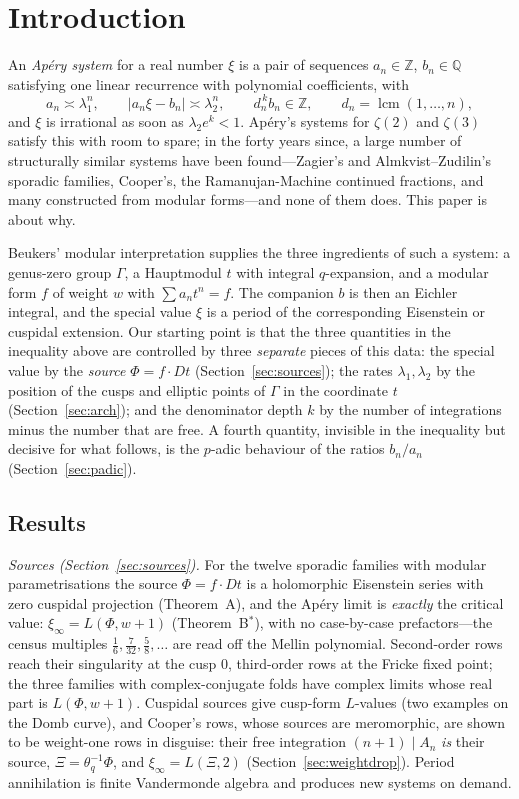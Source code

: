 \section{Introduction}\label{sec:intro}

An \emph{Ap\'ery system} for a real number $\xi$ is a pair of sequences $a_n\in\mathbb Z$, $b_n\in\mathbb Q$ satisfying one linear recurrence with polynomial coefficients, with
\[
a_n\asymp\lambda_1^n,\qquad |a_n\xi-b_n|\asymp\lambda_2^n,\qquad d_n^{\,k}b_n\in\mathbb Z,\qquad d_n=\operatorname{lcm}(1,\dots,n),
\]
and $\xi$ is irrational as soon as $\lambda_2e^k<1$. Ap\'ery's systems for $\zeta(2)$ and $\zeta(3)$ satisfy this with room to spare; in the forty years since, a large number of structurally similar systems have been found---Zagier's and Almkvist--Zudilin's sporadic families, Cooper's, the Ramanujan-Machine continued fractions, and many constructed from modular forms---and none of them does. This paper is about why.

Beukers' modular interpretation \cite{Beukers1987} supplies the three ingredients of such a system: a genus-zero group $\Gamma$, a Hauptmodul $t$ with integral $q$-expansion, and a modular form $f$ of weight $w$ with $\sum a_nt^n=f$. The companion $b$ is then an Eichler integral, and the special value $\xi$ is a period of the corresponding Eisenstein or cuspidal extension. Our starting point is that the three quantities in the inequality above are controlled by three \emph{separate} pieces of this data: the special value by the \emph{source} $\Phi=f\cdot Dt$ (Section~\ref{sec:sources}); the rates $\lambda_1,\lambda_2$ by the position of the cusps and elliptic points of $\Gamma$ in the coordinate $t$ (Section~\ref{sec:arch}); and the denominator depth $k$ by the number of integrations minus the number that are free. A fourth quantity, invisible in the inequality but decisive for what follows, is the $p$-adic behaviour of the ratios $b_n/a_n$ (Section~\ref{sec:padic}).

\subsection*{Results}

\emph{Sources (Section~\ref{sec:sources}).} For the twelve sporadic families with modular parametrisations the source $\Phi=f\cdot Dt$ is a holomorphic Eisenstein series with zero cuspidal projection (Theorem~A), and the Ap\'ery limit is \emph{exactly} the critical value: $\xi_\infty=L(\Phi,w+1)$ (Theorem~B$^*$), with no case-by-case prefactors---the census multiples $\tfrac16,\tfrac7{32},\tfrac58,\dots$ are read off the Mellin polynomial. Second-order rows reach their singularity at the cusp $0$, third-order rows at the Fricke fixed point; the three families with complex-conjugate folds have complex limits whose real part is $L(\Phi,w+1)$. Cuspidal sources give cusp-form $L$-values (two examples on the Domb curve), and Cooper's rows, whose sources are meromorphic, are shown to be weight-one rows in disguise: their free integration $(n+1)\mid A_n$ \emph{is} their source, $\Xi=\theta_q^{-1}\Phi$, and $\xi_\infty=L(\Xi,2)$ (Section~\ref{sec:weightdrop}). Period annihilation is finite Vandermonde algebra and produces new systems on demand.

